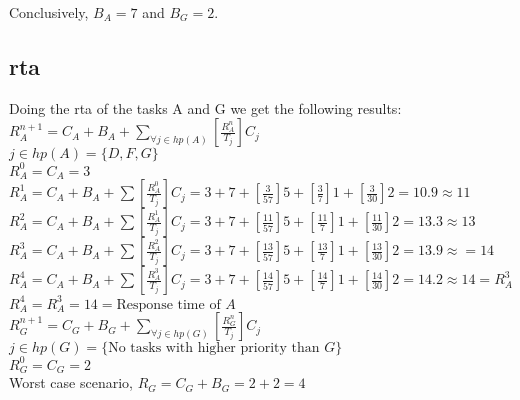     Conclusively, $B_A = 7$ and $B_G = 2$.\\

\subsection{\textbf{\ac{rta}}}
    Doing the \ac{rta} of the tasks A and G we get the following results:\\
    $R_A^{n+1} = C_A + B_A + \sum\limits_{\forall j \in hp(A)} \left[\frac{R_A^n}{T_j}\right] C_j$\\
    $j \in hp(A) = \{D, F, G\}$\\
    $R_A^0 = C_A = 3$ \\
    $R_A^{1} = C_A + B_A + \sum \left[\frac{R_A^0}{T_j}\right] C_j = 3 + 7 + \left[\frac{3}{57}\right]5 + \left[\frac{3}{7}\right]1 + \left[\frac{3}{30}\right]2 = 10.9 \approx 11$\\
    $R_A^{2} = C_A + B_A + \sum \left[\frac{R_A^1}{T_j}\right] C_j = 3 + 7 + \left[\frac{11}{57}\right]5 + \left[\frac{11}{7}\right]1 + \left[\frac{11}{30}\right]2 = 13.3 \approx 13$\\
    $R_A^{3} = C_A + B_A + \sum \left[\frac{R_A^2}{T_j}\right] C_j = 3 + 7 + \left[\frac{13}{57}\right]5 + \left[\frac{13}{7}\right]1 + \left[\frac{13}{30}\right]2 = 13.9 \approx  = 14$\\
    $R_A^{4} = C_A + B_A + \sum \left[\frac{R_A^3}{T_j}\right] C_j = 3 + 7 + \left[\frac{14}{57}\right]5 + \left[\frac{14}{7}\right]1 + \left[\frac{14}{30}\right]2 = 14.2 \approx 14 = R_A^3$\\
    $R_A^4 = R_A^3 = 14 = \text{Response time of }A$\\

    $R_G^{n+1} = C_G + B_G + \sum\limits_{\forall j \in hp(G)} \left[\frac{R_G^n}{T_j}\right] C_j$\\
    $j \in hp(G) = \{\text{No tasks with higher priority than }G\}$\\
    $R_G^0 = C_G = 2$ \\
    Worst case scenario, $R_G = C_G + B_G = 2 + 2 = 4$\\